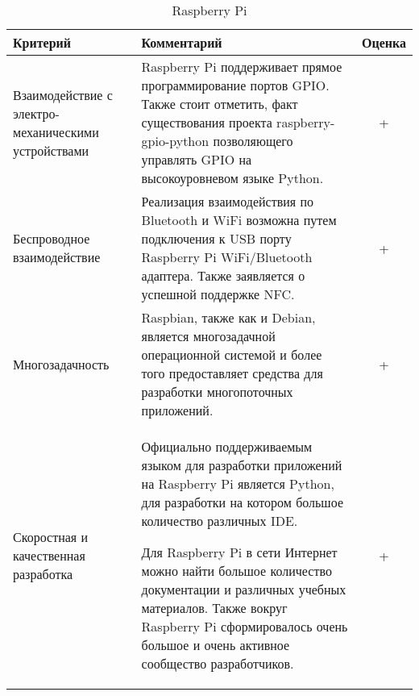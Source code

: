 \pagebreak

\bgroup %
\def\arraystretch{1.5}%
  \begin{longtable}{| p{} | p{} | c |} 
  \caption{Raspberry Pi} %
  \hline
    Критерий & Комментарий & Оценка \\
  \hline
    Взаимодействие с электро-механическими устройствами

    & Raspberry Pi поддерживает прямое программирование портов GPIO. Также стоит отметить, факт существования проекта raspberry-gpio-python позволяющего управлять GPIO на высокоуровневом языке Python.  
    & + \\
  \hline
    Беспроводное взаимодействие

    & Реализация взаимодействия по Bluetooth и WiFi возможна путем подключения к USB порту Raspberry Pi WiFi/Bluetooth адаптера. Также заявляется о успешной поддержке NFC.
    
    & + \\
  \hline
    Многозадачность

    & Raspbian, также как и Debian, является многозадачной операционной системой и более того предоставляет средства для разработки многопоточных приложений.

    & + \\
  \hline
    Скоростная и качественная разработка
    
    & Официально поддерживаемым языком для разработки приложений на Raspberry Pi является Python, для разработки на котором большое количество различных IDE.

    Для Raspberry Pi в сети Интернет можно найти большое количество документации и различных учебных материалов. Также вокруг Raspberry Pi сформировалось очень большое и очень активное сообщество разработчиков.

    & + \\
  \hline
  \end{longtable}
\egroup %

\pagebreak

